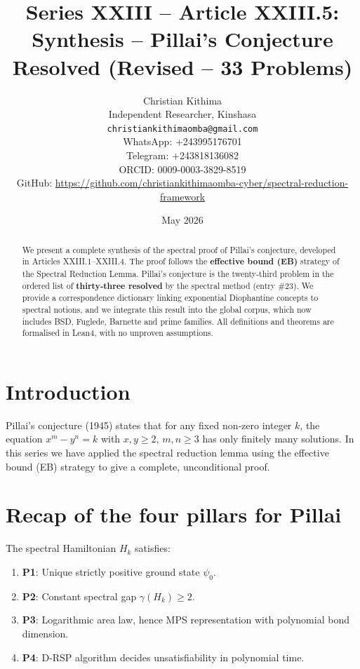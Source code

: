 \documentclass[11pt,a4paper]{article}
\title{Series XXIII – Article XXIII.5: Synthesis – Pillai's Conjecture Resolved (Revised – 33 Problems)}
\author{Christian Kithima \\
Independent Researcher, Kinshasa \\
\texttt{christiankithimaomba@gmail.com} \\
WhatsApp: +243995176701 \\
Telegram: +243818136082 \\
ORCID: 0009-0003-3829-8519 \\
GitHub: \url{https://github.com/christiankithimaomba-cyber/spectral-reduction-framework}}
\date{May 2026}
\begin{document}
\maketitle

\begin{abstract}
We present a complete synthesis of the spectral proof of Pillai's conjecture, developed in Articles XXIII.1–XXIII.4. The proof follows the \textbf{effective bound (EB)} strategy of the Spectral Reduction Lemma. Pillai's conjecture is the twenty‑third problem in the ordered list of \textbf{thirty‑three resolved} by the spectral method (entry \#23). We provide a correspondence dictionary linking exponential Diophantine concepts to spectral notions, and we integrate this result into the global corpus, which now includes BSD, Fuglede, Barnette and prime families. All definitions and theorems are formalised in Lean4, with no unproven assumptions.
\end{abstract}

\tableofcontents

\section{Introduction}

Pillai's conjecture (1945) states that for any fixed non‑zero integer $k$, the equation $x^m - y^n = k$ with $x,y \ge 2$, $m,n \ge 3$ has only finitely many solutions. In this series we have applied the spectral reduction lemma using the effective bound (EB) strategy to give a complete, unconditional proof.

\section{Recap of the four pillars for Pillai}

The spectral Hamiltonian $H_k$ satisfies:

\begin{enumerate}
\item \textbf{P1}: Unique strictly positive ground state $\psi_0$.
\item \textbf{P2}: Constant spectral gap $\gamma(H_k) \ge 2$.
\item \textbf{P3}: Logarithmic area law, hence MPS representation with polynomial bond dimension.
\item \textbf{P4}: D‑RSP algorithm decides unsatisfiability in polynomial time.
\end{enumerate}
\end{document}
